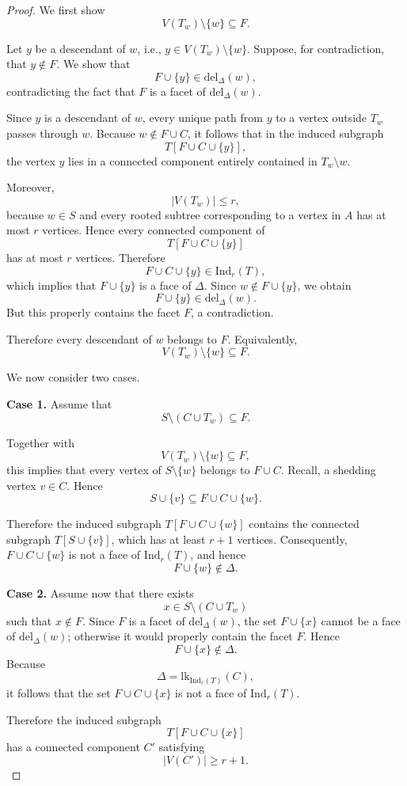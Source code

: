 \documentclass[12pt,reqno]{amsart}
\theoremstyle{definition}
\def\Ind{\mathrm{Ind}}
\def\del{\mathrm{del}}
\def\lk{\mathrm{lk}}
\begin{document}
\begin{proof}
We first show
\[
V(T_w)\setminus\{w\}\subseteq F.
\]

Let \(y\) be a descendant of \(w\), i.e., \(y \in V(T_w)\setminus\{w\}\). Suppose, for contradiction, that \(y\notin F\).
We show that
\[
F\cup\{y\}\in\del_\Delta(w),
\]
contradicting the fact that $F$ is a facet of $\del_{\Delta}(w)$.

Since \(y\) is a descendant of \(w\), every unique path from \(y\) to a vertex outside \(T_w\) passes through \(w\). Because $w\notin F\cup C$, it follows that in the induced subgraph
\[
T[F\cup C\cup\{y\}],
\]
the vertex \(y\) lies in a connected component entirely contained in \(T_w \setminus w\).

Moreover,
\[
|V(T_w)|\le r,
\]
because \(w\in S\) and every rooted subtree corresponding to a vertex in \(A\) has at most
\(r\) vertices. Hence every connected component of
\[
T[F\cup C\cup\{y\}]
\]
has at most \(r\) vertices. Therefore
\[
F\cup C\cup\{y\}\in\Ind_r(T),
\]
which implies that $F\cup\{y\}$ is a face of $\Delta$. Since $w\notin F\cup\{y\}$,
we obtain
\[
F\cup\{y\}\in\del_\Delta(w).
\]
But this properly contains the facet \(F\), a contradiction.

Therefore every descendant of \(w\) belongs to \(F\). Equivalently,
\[
V(T_w)\setminus\{w\}\subseteq F.
\]

We now consider two cases.

\medskip
\noindent
\textbf{Case 1.}
Assume that
\[
S\setminus(C\cup T_w)\subseteq F.
\]

Together with
\[
V(T_w)\setminus\{w\}\subseteq F,
\]
this implies that every vertex of \(S\setminus\{w\}\) belongs to \(F\cup C\). Recall, a shedding vertex $v \in C$. Hence
\[
S\cup\{v\}\subseteq F\cup C\cup\{w\}.
\]

Therefore the induced subgraph $T[F\cup C\cup\{w\}]$ contains the connected subgraph $T[S\cup\{v\}]$, which has at least \(r+1\) vertices. Consequently, $F\cup C\cup\{w\}$ is not a face of $\Ind_r(T)$, and hence
\[
F\cup\{w\}\notin\Delta.
\]

\medskip
\noindent
\textbf{Case 2.}
Assume now that there exists
\[
x\in S\setminus(C\cup T_w)
\]
such that $x\notin F$. Since \(F\) is a facet of \(\del_\Delta(w)\), the set $F\cup\{x\}$
cannot be a face of \(\del_\Delta(w)\); otherwise it would properly contain the facet \(F\). Hence
\[
F\cup\{x\}\notin\Delta.
\]
Because
\[
\Delta=\lk_{\Ind_r(T)}(C),
\]
it follows that the set $F\cup C\cup\{x\}$ is not a face of $\Ind_r(T)$.

Therefore the induced subgraph
\[
T[F\cup C\cup\{x\}]
\]
has a connected component \(C'\) satisfying
\[
|V(C')|\ge r+1.
\]


\end{proof}
\end{document}
